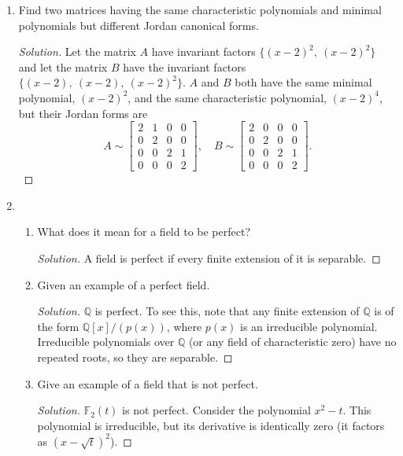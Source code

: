 \documentclass[11pt,letterpaper]{report}
\newcommand{\rationals}{\mathbb{Q}}
\newcommand{\field}{\mathbb{F}}
\newenvironment{solution}
{\begin{proof}[Solution]}
{\end{proof}}
\begin{document}
\begin{enumerate}
	\item Find two matrices having the same characteristic polynomials and minimal polynomials but different Jordan canonical forms.
	\begin{solution}
		Let the matrix $A$ have invariant factors $\{(x-2)^2,\ (x-2)^2\}$ and let the matrix $B$ have the invariant factors $\{(x-2),\ (x-2),\ (x-2)^2\}$. $A$ and $B$ both have the same minimal polynomial, $(x-2)^2$, and the same characteristic polynomial, $(x-2)^4$, but their Jordan forms are
		\[
		A\sim \begin{bmatrix}
			2 & 1 & 0 & 0\\
			0 & 2 & 0 & 0\\
			0 & 0 & 2 & 1\\
			0 & 0 & 0 & 2
		\end{bmatrix},\quad
		B\sim \begin{bmatrix}
			2 & 0 & 0 & 0\\
			0 & 2 & 0 & 0\\
			0 & 0 & 2 & 1\\
			0 & 0 & 0 & 2
		\end{bmatrix}.
		\]
	\end{solution}
	\item \begin{enumerate}
		\item What does it mean for a field to be perfect?
		\begin{solution}
			A field is perfect if every finite extension of it is separable.
		\end{solution}
		\item Given an example of a perfect field.
		\begin{solution}
			$\rationals$ is perfect. To see this, note that any finite extension of $\rationals$ is of the form $\rationals[x]/(p(x))$, where $p(x)$ is an irreducible polynomial. Irreducible polynomials over $\rationals$ (or any field of characteristic zero) have no repeated roots, so they are separable.
		\end{solution}
		\item Give an example of a field that is not perfect.
		\begin{solution}
			$\field_2(t)$ is not perfect. Consider the polynomial $x^2-t$. This polynomial is irreducible, but its derivative is identically zero (it factors as $(x-\sqrt{t})^2$).
		\end{solution}
	\end{enumerate}


\end{enumerate}
\end{document}
